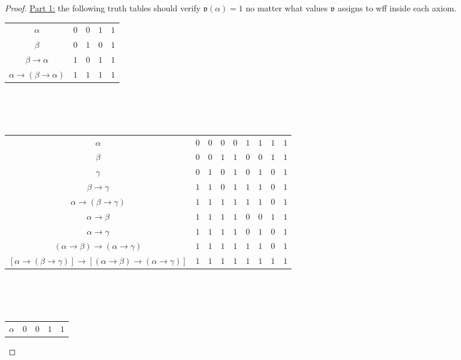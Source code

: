 \documentclass{treatise}
\begin{document}
\begin{proof}
\underline{Part 1:} the following truth tables should verify $\mathfrak{v}(\alpha) = 1$ no matter what values $\mathfrak{v}$ assigns to wff inside each axiom.
\begin{center}
    \begin{tabular}{|c|cccc|}
        \hline
        $\alpha$ & $0$ & $0$ & $1$ & $1$ \\
        $\beta$ & $0$ & $1$ & $0$ & $1$ \\
        \hline
        $\beta \to \alpha$ & $1$ & $0$ & $1$ & $1$ \\
        $\alpha \to (\beta \to \alpha)$ & $1$ & $1$ & $1$ & $1$ \\
        \hline
    \end{tabular}
    \ \\
    \ \\
    \ \\
    \begin{tabular}{|c|cccccccc|}
        \hline
        $\alpha$ & $0$ & $0$ & $0$ & $0$ & $1$ & $1$ & $1$ & $1$ \\
        $\beta$ & $0$ & $0$ & $1$ & $1$ & $0$ & $0$ & $1$ & $1$ \\
        $\gamma$ & $0$ & $1$ & $0$ & $1$ & $0$ & $1$ & $0$ & $1$ \\
        \hline
        $\beta \to \gamma$ & $1$ & $1$ & $0$ & $1$ & $1$ & $1$ & $0$ & $1$ \\
        $\alpha \to (\beta \to \gamma)$ & $1$ & $1$ & $1$ & $1$ & $1$ & $1$ & $0$ & $1$ \\
        \hline
        $\alpha \to \beta$ & $1$ & $1$ & $1$ & $1$ & $0$ & $0$ & $1$ & $1$ \\
        $\alpha \to \gamma$ & $1$ & $1$ & $1$ & $1$ & $0$ & $1$ & $0$ & $1$ \\
        $(\alpha \to \beta) \to (\alpha \to \gamma)$ & $1$ & $1$ & $1$ & $1$ & $1$ & $1$ & $0$ & $1$ \\
        \hline
        $[\alpha \to (\beta \to \gamma)] \to [(\alpha \to \beta) \to (\alpha \to \gamma)]$ & $1$ & $1$ & $1$ & $1$ & $1$ & $1$ & $1$ & $1$ \\
        \hline
    \end{tabular}
    \ \\
    \ \\
    \ \\
    \begin{tabular}{|c|cccc|}
        \hline
        $\alpha$ & $0$ & $0$ & $1$ & $1$ \\

\end{tabular}
\end{center}
\end{proof}
\end{document}
